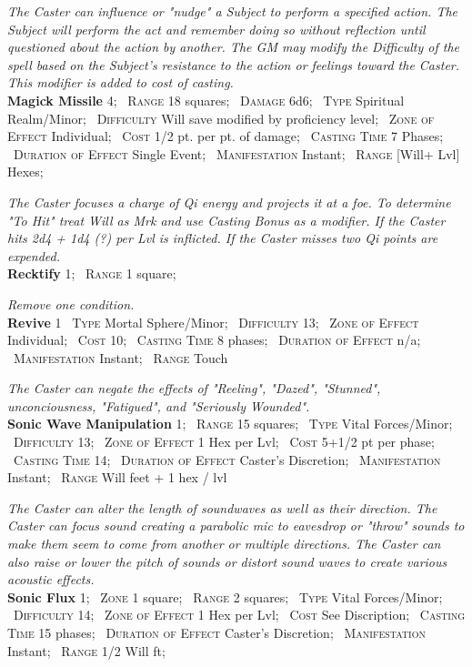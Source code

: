 \documentclass[11pt]{article}
\newcommand{\spell}[1]{{\sc\bfseries\large #1}}
\begin{document}
\noindent\textsl{The Caster can influence or "nudge" a Subject to
  perform a specified action. The Subject will perform the act and
  remember doing so without reflection until questioned about the
  action by another. The GM may modify the Difficulty of the spell
  based on the Subject's resistance to the action or feelings toward
  the Caster. This modifier is added to cost of casting.}
%
\\[6pt]
%
\spell{Magick Missile} 4;
\ \textsc{Range} 18 squares;
\ \textsc{Damage} 6d6;
\ \textsc{Type} Spiritual Realm/Minor;
\ \textsc{Difficulty} Will save modified by proficiency level;
\ \textsc{Zone of Effect} Individual;
\ \textsc{Cost} 1/2 pt. per pt. of damage;
\ \textsc{Casting Time} 7 Phases;
\ \textsc{Duration of Effect} Single Event;
\ \textsc{Manifestation} Instant;
\ \textsc{Range} [Will+ Lvl] Hexes;

\noindent\textsl{The Caster focuses a charge of Qi energy and projects
  it at a foe. To determine "To Hit" treat Will as Mrk and use Casting
  Bonus as a modifier. If the Caster hits 2d4 + 1d4 (?) per Lvl is
  inflicted. If the Caster misses two Qi points are expended.}
%
\\[6pt]
%
\spell{Recktify} 1;
\ \textsc{Range} 1 square;

\noindent\textsl{Remove one condition.}
%
\\[6pt]
%
\spell{Revive} 1
\ \textsc{Type} Mortal Sphere/Minor;
\ \textsc{Difficulty} 13;
\ \textsc{Zone of Effect} Individual;
\ \textsc{Cost} 10;
\ \textsc{Casting Time} 8 phases;
\ \textsc{Duration of Effect} n/a;
\ \textsc{Manifestation} Instant;
\ \textsc{Range} Touch

\noindent\textsl{The Caster can negate the effects of "Reeling",
  "Dazed", "Stunned", unconciousness, "Fatigued", and "Seriously
  Wounded".}
%
\\[6pt]
%
\spell{Sonic Wave Manipulation} 1;
\ \textsc{Range} 15 squares;
\ \textsc{Type} Vital Forces/Minor;
\ \textsc{Difficulty} 13;
\ \textsc{Zone of Effect} 1 Hex per Lvl;
\ \textsc{Cost} 5+1/2 pt per phase;
\ \textsc{Casting Time}	14;
\ \textsc{Duration of Effect} Caster's Discretion;
\ \textsc{Manifestation} Instant;
\ \textsc{Range} Will feet + 1 hex / lvl

\noindent\textsl{The Caster can alter the length of soundwaves as well as their
direction. The Caster can focus sound creating a parabolic mic to
eavesdrop or "throw" sounds to make them seem to come from another or
multiple directions. The Caster can also raise or lower the pitch of
sounds or distort sound waves to create various acoustic effects.}
%
\\[6pt]
%
\spell{Sonic Flux} 1;
\ \textsc{Zone} 1 square;
\ \textsc{Range} 2 squares;
\ \textsc{Type} Vital Forces/Minor;
\ \textsc{Difficulty} 14;
\ \textsc{Zone of Effect} 1 Hex per Lvl;
\ \textsc{Cost} See Discription;
\ \textsc{Casting Time} 15 phases;
\ \textsc{Duration of Effect} Caster's Discretion;
\ \textsc{Manifestation} Instant;
\ \textsc{Range} 1/2 Will ft;
\end{document}
